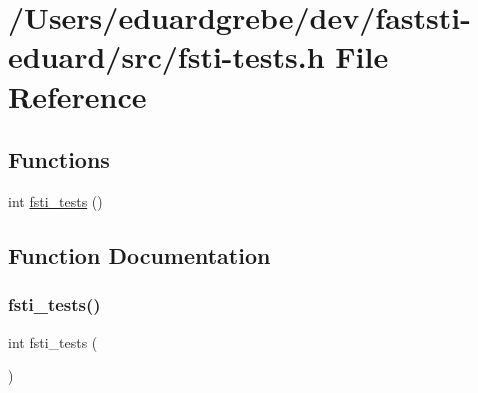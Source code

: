 \hypertarget{fsti-tests_8h}{}\section{/\+Users/eduardgrebe/dev/faststi-\/eduard/src/fsti-\/tests.h File Reference}
\label{fsti-tests_8h}
\subsection*{Functions}
\begin{DoxyCompactItemize}
\item 
int \mbox{\hyperlink{fsti-tests_8h_a6d22e84aa78560b52172df37e4c4923f}{fsti\+\_\+tests}} ()
\end{DoxyCompactItemize}


\subsection{Function Documentation}
\mbox{\label{fsti-tests_8h_a6d22e84aa78560b52172df37e4c4923f}} 
\subsubsection{\texorpdfstring{fsti\+\_\+tests()}{fsti\_tests()}}
{\footnotesize\ttfamily int fsti\+\_\+tests (\begin{DoxyParamCaption}{ }\end{DoxyParamCaption})}

